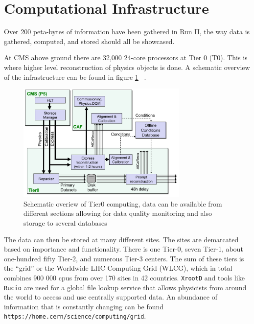 \section{Computational Infrastructure}
Over 200 peta-bytes of information have been gathered in Run II, the way data is gathered, computed, and stored should all be showcased. 

At CMS above ground there are 32,000 24-core processors at Tier 0 (T0). This is where higher level reconstruction of physics objects is done. A schematic overview of the infrastructure can be found in figure \ref{fig:t0} ~\cite{Hufnagel:1319049}. 

\begin{figure}[ht!b]
  \centering
\includegraphics[width=0.75\textwidth]{figures/Tier0.png}    
    \caption{\label{fig:t0} Schematic overiew of Tier0 computing, data can be available from different sections allowing for data quality monitoring and also storage to several databases ~\cite{Hufnagel:1319049} }
\end{figure}

The data can then be stored at many different sites. The sites are demarcated based on importance and functionality. There is one Tier-0, seven Tier-1, about one-hundred fifty Tier-2, and numerous Tier-3 centers. The sum of these tiers is the ``grid'' or the Worldwide LHC Computing Grid (WLCG), which in total combines 900 000 cpus from over 170 sites in 42 countries. \texttt{XrootD} and tools like \texttt{Rucio} are used for a global file lookup service that allows physicists from around the world to access and use centrally supported data. An abundance of information that is constantly changing can be found \texttt{https://home.cern/science/computing/grid}. 



